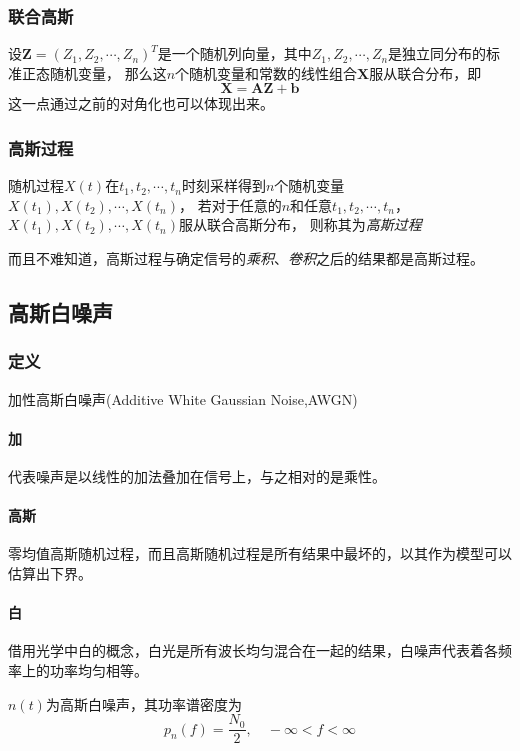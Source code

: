     \subsubsection{联合高斯}
    设$\bm Z=(Z_1,Z_2,\cdots,Z_n)^T$是一个随机列向量，其中$Z_1,Z_2,\cdots,Z_n$是独立同分布的标准正态随机变量，
    那么这$n$个随机变量和常数的线性组合$\bm X$服从联合分布，即
    \begin{equation}
        \bm X=\bm{AZ}+\bm b
    \end{equation}
    这一点通过之前的对角化也可以体现出来。

    \subsubsection{高斯过程}
    随机过程$X(t)$在$t_1,t_2,\cdots,t_n$时刻采样得到$n$个随机变量$X(t_1),X(t_2),\cdots,X(t_n)$，
    若对于任意的$n$和任意$t_1,t_2,\cdots,t_n$，$X(t_1),X(t_2),\cdots,X(t_n)$服从联合高斯分布，
    则称其为\emph{高斯过程}

    而且不难知道，高斯过程与确定信号的\emph{乘积}、\emph{卷积}之后的结果都是高斯过程。
    
\subsection{高斯白噪声}
    \subsubsection{定义}
    加性高斯白噪声(Additive White Gaussian Noise,AWGN)
    
    \paragraph{加}代表噪声是以线性的加法叠加在信号上，与之相对的是乘性。

    \paragraph{高斯}零均值高斯随机过程，而且高斯随机过程是所有结果中最坏的，以其作为模型可以估算出下界。

    \paragraph{白}借用光学中白的概念，白光是所有波长均匀混合在一起的结果，白噪声代表着各频率上的功率均匀相等。

    $n(t)$为高斯白噪声，其功率谱密度为
    \begin{equation}
        p_n(f)=\frac{N_0}{2},\hspace{1em}-\infty<f<\infty
    \end{equation}
    
